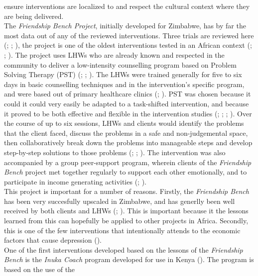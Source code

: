\documentclass[stu,a4paper,12pt,donotrepeattitle]{apa7}
\begin{document}
ensure interventions are localized to and respect the cultural context where
they are being delivered.\\
The \textit{Friendship Bench Project}, initially developed for Zimbabwe,
has by far the most data out of any of the reviewed interventions.
Three trials are reviewed here (\cite{chibandaetal11}; \cite{chibandaetal15};
\cite{fernaetal21}), the project is one of the oldest interventions tested in
an African context (\cite{abasal16}; \cite{chibandaetal11}; \cite{fernaetal21}).
The project uses LHWs who are already known and respected in the community to
deliver a low-intensity counselling program based on Problem Solving Therapy
(PST) (\cite{abasal16}; \cite{chibandaetal11}; \cite{fernaetal21}). The LHWs
were trained generally for five to six days in basic counselling techniques and
in the intervention's specific program, and were based out of primary healthcare
clinics (\cite{abasal16}; \cite{fernaetal21}). PST was chosen because it could
it could very easily be adapted to a task-shifted intervention, and because it
proved to be both effective and flexible in the intervention studies
(\cite{abasal16}; \cite{chibandaetal11}; \cite{chibandaetal15};
\cite{fernaetal21}). Over the course of up to six sessions, LHWs and clients
would identify the problems that the client faced, discuss the problems in a
safe and non-judgemental space, then collaboratively break down the problems
into manageable steps and develop step-by-step solutions to those problems
(\cite{abasal16}; \cite{chibandaetal15}; \cite{fernaetal21}). The intervention
was also accompanied by a group peer-support program, wherein clients of the
\textit{Friendship Bench} project met together regularly to support each other
emotionally, and to participate in income generating activities
(\cite{abasal16}; \cite{fernaetal21}).\\
This project is important for a number of reasons. Firstly, the
\textit{Friendship Bench} has been very succesfully upscaled in Zimbabwe, and
has generlly been well received by both clients and LHWs (\cite{abasal16};
\cite{fernaetal21}). This is important because it the lessons learned from this
can hopefully be applied to other projects in Africa. Secondly, this is one of
the few interventions that intentionally attends to the economic factors that
cause depression (\cite{fernaetal21}).\\
One of the first interventions developed based on the lessons of the
\textit{Friendship Bench} is the \textit{Inuka Coach} program developed for use
in Kenya (\cite{douketal21}). The program is based on the use of the
\end{document}

